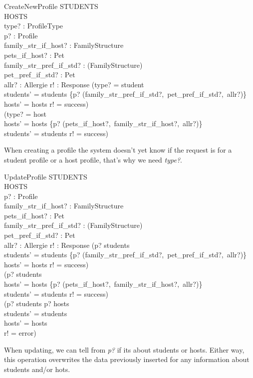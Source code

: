 \documentclass[11pt]{article}
\begin{document}
\begin{schema}{CreateNewProfile}
	\Delta STUDENTS\\
	\Delta HOSTS\\
	type? : ProfileType\\
	p? : Profile\\
	family\_str\_if\_host? : FamilyStructure\\
	pets\_if\_host? : \power Pet\\
	family\_str\_pref\_if\_std? : \power (\nat \rightarrow FamilyStructure)\\
	pet\_pref\_if\_std? : \power Pet\\
	allr? : \power Allergie
	r! : Response
\where
	(type? = student \wedge\\
	\indent students' = students \cup \{p? \mapsto (family\_str\_pref\_if\_std?,\ pet\_pref\_if\_std?,\ allr?)\} \wedge\\
	\indent hosts' = hosts \wedge r! = success)\ \vee\\
	(type? = host \wedge\\
	 \indent hosts' = hosts \cup \{p? \mapsto (pets\_if\_host?,\ family\_str\_if\_host?,\ allr?)\} \wedge\\
	 \indent students' = students \wedge r! = success)
\end{schema}
When creating a profile the system doesn't yet know if the request is for a student profile or a host profile, that's why we need \emph{type?}.

\begin{schema}{UpdateProfile}
	\Delta STUDENTS\\
	\Delta HOSTS\\
	p? : Profile\\
	family\_str\_if\_host? : FamilyStructure\\
	pets\_if\_host? : \power Pet\\
	family\_str\_pref\_if\_std? : \power (\nat \rightarrow FamilyStructure)\\
	pet\_pref\_if\_std? : \power Pet\\
	allr? : \power Allergie
	r! : Response
\where
	(p? \in \dom students \wedge\\
	\indent students' = students \cup \{p? \mapsto (family\_str\_pref\_if\_std?,\ pet\_pref\_if\_std?,\ allr?)\} \wedge\\
	\indent hosts' = hosts \wedge r! = success)\ \vee\\
	(p? \in \dom students \wedge\\
	\indent hosts' = hosts \cup \{p? \mapsto (pets\_if\_host?,\ family\_str\_if\_host?,\ allr?)\} \wedge\\
	\indent students' = students \wedge r! = success)\ \vee\\
	(p? \not\in \dom students \wedge p? \not\in \dom hosts\ \wedge\\
	\indent students' = students\\
	\indent hosts' = hosts\\
	\indent r! = error)
\end{schema}
When updating, we can tell from \emph{p?} if its about students or hosts. Either way, this operation overwrites the data previously inserted for any information about students and/or hots.
\end{document}
